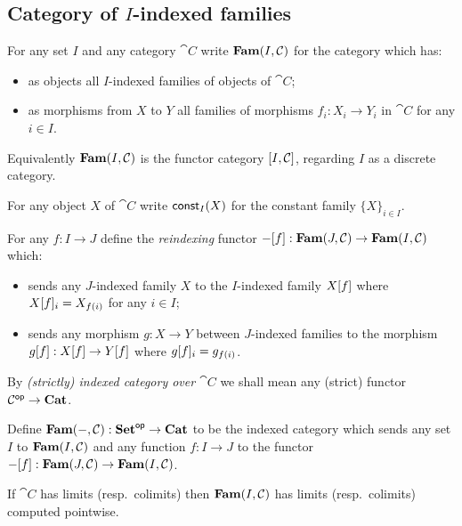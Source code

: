 \subsection{Category of $I$-indexed families}
\label{sec:fam}

\begin{definition}
\label{def:fam:Fam}
For any set $I$ and any category $\cat{C}$ write $\mathbf{Fam}(I,\mathcal{C})$ for the category which has:
\begin{itemize}
\item as objects all $I$-indexed families of objects of $\cat{C}$;
\item as morphisms from $X$ to $Y$ all families of morphisms $f_i: X_i \to Y_i$ in $\cat{C}$ for any $i \in
I$.
\end{itemize}
\end{definition}

\noindent Equivalently $\mathbf{Fam}(I,\mathcal{C})$ is the functor category $[I,\mathcal{C}]$, regarding $I$ as a
discrete category.

\begin{definition}
For any object $X$ of $\cat{C}$ write $\mathsf{const}_I(X)$ for the constant family $\{X\}_{i \in I}$.
\end{definition}

\begin{definition}[Reindexing]
For any $f: I \to J$ define the \emph{reindexing} functor $-[f]: \mathbf{Fam}(J,\mathcal{C}) \to
\mathbf{Fam}(I,\mathcal{C})$ which:
\begin{itemize}
\item sends any $J$-indexed family $X$ to the $I$-indexed family $X[f]$ where $X[f]_i =
X_{f(i)}$ for any $i \in I$;
\item sends any morphism $g: X \to Y$ between $J$-indexed families to the morphism $g[f]:
X[f] \to Y[f]$ where $g[f]_i = g_{f(i)}$.
\end{itemize}
\end{definition}

By \emph{(strictly) indexed category over $\cat{C}$} we shall mean any (strict) functor $\mathcal{C}^{\mathsf{op}} \to
\mathbf{Cat}$.

\begin{definition}
Define $\mathbf{Fam}(-,\mathcal{C}): \mathbf{Set}^{\mathsf{op}} \to \mathbf{Cat}$ to be the indexed category which sends any set $I$ to
$\mathbf{Fam}(I,\mathcal{C})$ and any function $f: I \to J$ to the functor $-[f]: \mathbf{Fam}(J,\mathcal{C}) \to
\mathbf{Fam}(I,\mathcal{C})$.
\end{definition}

\begin{proposition}
If $\cat{C}$ has limits (resp.~colimits) then $\mathbf{Fam}(I,\mathcal{C})$ has limits (resp.~colimits) computed
pointwise.
\end{proposition}
